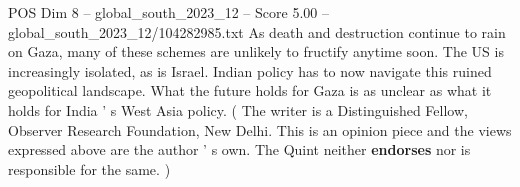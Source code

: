 \begin{textsample}{POS Dim 8 – global\_south\_2023\_12 – Score 5.00 – global\_south\_2023\_12/104282985.txt}
As death and destruction continue to rain on Gaza, many of these schemes are unlikely to fructify anytime soon.
The US is increasingly isolated, as is Israel.
Indian policy has to now navigate this ruined geopolitical landscape.
What the future holds for Gaza is as unclear as what it holds for India ' s West Asia policy. ( The writer is a Distinguished Fellow, Observer Research Foundation, New Delhi.
This is an opinion piece and the views expressed above are the author ' s own.
The Quint neither \textbf{endorses} nor is responsible for the same. )

\end{textsample}
